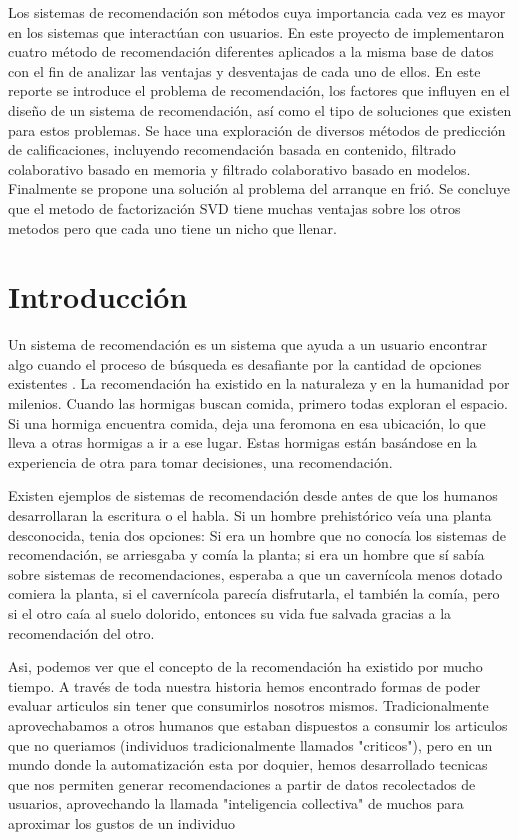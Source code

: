 \documentclass[11pt]{article}
\begin{document}
Los sistemas de recomendación son métodos cuya importancia cada vez es mayor en
los sistemas que interactúan con usuarios. En este proyecto de implementaron
cuatro método de recomendación diferentes aplicados a la misma base de datos con
el fin de analizar las ventajas y desventajas de cada uno de ellos. En este
reporte se introduce el problema de recomendación, los factores que influyen en
el diseño de un sistema de recomendación, así como el tipo de soluciones que
existen para estos problemas. Se hace una exploración de diversos métodos de
predicción de calificaciones, incluyendo recomendación basada en contenido,
filtrado colaborativo basado en memoria y filtrado colaborativo basado en
modelos. Finalmente se propone una solución al problema del arranque en frió. Se
concluye que el metodo de factorización SVD tiene muchas ventajas sobre los
otros metodos pero que cada uno tiene un nicho que llenar.

\section{Introducción}

Un sistema de recomendación es un sistema que ayuda a un usuario encontrar algo
cuando el proceso de búsqueda es desafiante por la cantidad de opciones
existentes \cite{su2009survey}. La recomendación ha existido en la naturaleza y
en la humanidad por milenios. Cuando las hormigas buscan comida, primero todas
exploran el espacio. Si una hormiga encuentra comida, deja una feromona en esa
ubicación, lo que lleva a otras hormigas a ir a ese lugar. Estas hormigas están
basándose en la experiencia de otra para tomar decisiones, una recomendación.

Existen ejemplos de sistemas de recomendación desde antes de que los humanos
desarrollaran la escritura o el habla. Si un hombre prehistórico veía una planta
desconocida, tenia dos opciones: Si era un hombre que no conocía los sistemas de
recomendación, se arriesgaba y comía la planta; si era un hombre que sí sabía
sobre sistemas de recomendaciones, esperaba a que un cavernícola menos dotado
comiera la planta, si el cavernícola parecía disfrutarla, el también la comía,
pero si el otro caía al suelo dolorido, entonces su vida fue salvada gracias a
la recomendación del otro.

Asi, podemos ver que el concepto de la recomendación ha existido por mucho
tiempo. A través de toda nuestra historia hemos encontrado formas de poder
evaluar articulos sin tener que consumirlos nosotros mismos. Tradicionalmente
aprovechabamos a otros humanos que estaban dispuestos a consumir los articulos
que no queriamos (individuos tradicionalmente llamados "criticos"), pero en un
mundo donde la automatización esta por doquier, hemos desarrollado tecnicas que
nos permiten generar recomendaciones a partir de datos recolectados de usuarios,
aprovechando la llamada "inteligencia collectiva" de muchos para aproximar los
gustos de un individuo
\end{document}
